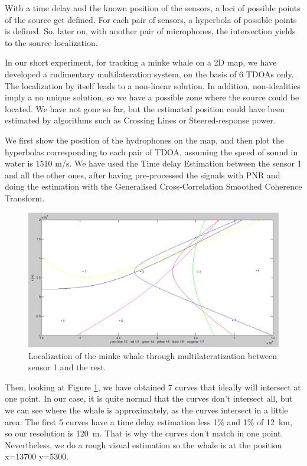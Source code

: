 With a time delay and the known position of the sensors, a loci of possible points of the source get defined. For each pair of sensors, a hyperbola of possible points is defined. So, later on, with another pair of microphones, the intersection yields to the source localization.

In our short experiment, for tracking a minke whale on a 2D map, we have developed a rudimentary multilateration system, on the basis of 6 TDOAs only. The localization by itself leads to a non-linear solution. In addition, non-idealities imply a no unique solution, so we have a possible zone where the source could be located. We have not gone so far, but the estimated position could have been estimated by algorithms such as Crossing Lines or Steered-response power.

We first show the position of the hydrophones on the map, and then plot the hyperbolas corresponding to each pair of TDOA, assuming the speed of sound in water is 1510 m/s.  We have used the Time delay Estimation between the sensor 1 and all the other ones, after having pre-processed the signals with PNR and doing the estimation with the Generalised Cross-Correlation Smoothed Coherence Transform. 

\begin{figure}[htb]
	\begin{center}
		\includegraphics[width=1\textwidth]{figures/7_local.png}
	\end{center}
	\caption{Localization of the minke whale through multilateratization between sensor 1 and the rest.}
	\label{fig:local}
\end{figure}

Then, looking at Figure \ref{fig:local}, we have obtained 7 curves that ideally will intersect at one point. In our case, it is quite normal that the curves don't intersect all, but we can see where the whale is approximately, as the curves intersect in a little area. The first 5 curves have a time delay estimation less 1\% and 1\% of \SI{12}{\kilo\meter}, so our resolution is \SI{120}{\meter}. That is why the curves don't match in one point. Nevertheless, we do a rough visual estimation so the whale is at the position x=13700 y=5300.
